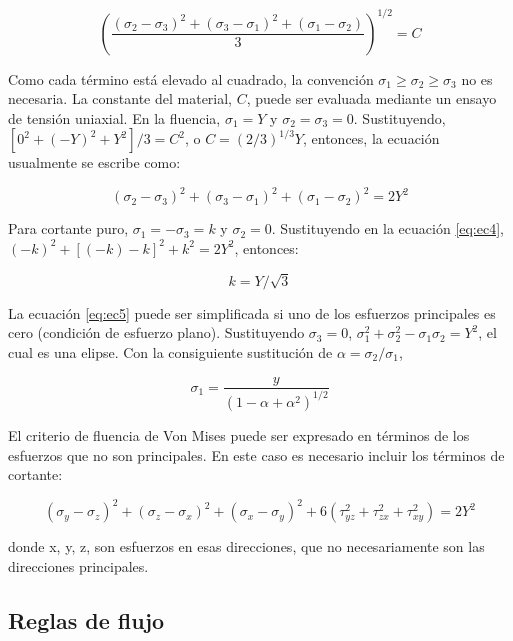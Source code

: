 \begin{equation} \label{eq:ec3}
\left( \frac{ (\sigma_2-\sigma_3)^2 + (\sigma_3-\sigma_1 )^2 + (\sigma_1-\sigma_2)}{3} \right) ^{1/2} = C
\end{equation}

Como cada término está elevado al cuadrado, la convención $\sigma_1 \geq \sigma_2 \geq \sigma_3$ no es necesaria. 
La constante del material, $C$, puede ser evaluada mediante un ensayo de tensión uniaxial. En la fluencia, 
$\sigma_1 = Y$ y $\sigma_2 = \sigma_3 = 0$. Sustituyendo, $[0^2 + (-Y)^2 + Y^2]/3 = C^2$, o 
$C = (2/3)^{1/3} Y $, entonces, la ecuación usualmente se escribe como:

\begin{equation}\label{eq:ec4}
(\sigma_2-\sigma_3)^2 + (\sigma_3-\sigma_1 )^2 + (\sigma_1-\sigma_2 )^2 = 2Y^2
\end{equation}

Para cortante puro, $\sigma_1 = -\sigma_3 = k$ y $\sigma_2=0$. Sustituyendo en la ecuación \ref{eq:ec4}, 
$ (-k)^2 + [ (-k)-k ]^2 + k^2 = 2Y^2 $, entonces:

\begin{equation}\label{eq:ec5}
k = Y / \sqrt{3}
\end{equation}

La ecuación \ref{eq:ec5} puede ser simplificada si uno de los esfuerzos principales es cero (condición de esfuerzo plano). 
Sustituyendo $\sigma_3 = 0$, $\sigma_1^2 + \sigma_2^2 - \sigma_1 \sigma_2 = Y^2$, el cual es una elipse. Con la 
consiguiente sustitución de $\alpha = \sigma_2/\sigma_1$,

\begin{equation}
\sigma_1 = \frac{y}{(1-\alpha+\alpha^2)^{1/2}}
\end{equation}

El criterio de fluencia de Von Mises puede ser expresado en términos de los esfuerzos que no son principales. 
En este caso es necesario incluir los términos de cortante:

\begin{equation}
(\sigma_y - \sigma_z)^2 + (\sigma_z - \sigma_x)^2 + (\sigma_x - \sigma_y)^2 + 6 (\tau_{yz}^2 + \tau_{zx}^2 + \tau_{xy}^2) = 2Y^2
\end{equation}

donde x, y, z, son esfuerzos en esas direcciones, que no necesariamente son las direcciones principales.


\subsection{Reglas de flujo}

